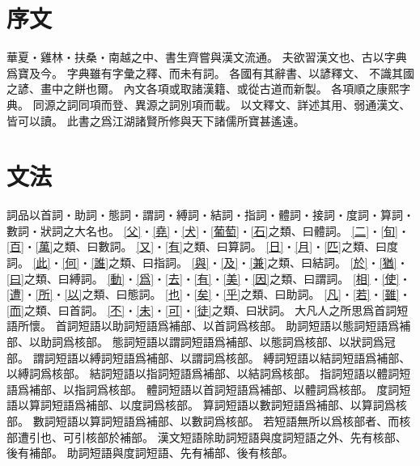 \chapter*{序文}
華夏・雞林・扶桑・南越之中、書生齊嘗與漢文流通。
夫欲習漢文也、古以字典爲寶及今。
字典雖有字彙之釋、而未有詞。
各國有其辭書、以諺釋文、
不識其國之諺、畫中之餅也爾。
內文各項或取諸漢籍、或從古道而新製。
各項順之康熙字典。
同源之詞同項而登、異源之詞別項而載。
以文釋文、詳述其用、弱通漢文、皆可以讀。
此書之爲江湖諸賢所修與天下諸儒所寶甚遙遠。
\chapter*{文法}
詞品以首詞・助詞・態詞・謂詞・縛詞・結詞・指詞・體詞・接詞・度詞・算詞・數詞・狀詞之大名也。
\cref{父}・\cref{堯}・\cref{犬}・\cref{葡萄}・\cref{石}之類、曰體詞。
\cref{二}・\cref{旬}・\cref{百}・\cref{萬}之類、曰數詞。
\cref{又}・\cref{有}之類、曰算詞。
\cref{日}・\cref{月}・\cref{匹}之類、曰度詞。
\cref{此}・\cref{何}・\cref{誰}之類、曰指詞。
\cref{與}・\cref{及}・\cref{兼}之類、曰結詞。
\cref{於}・\cref{猶}・\cref{曰}之類、曰縛詞。
\cref{動}・\cref{爲}・\cref{去}・\cref{有}・\cref{美}・\cref{因}之類、曰謂詞。
\cref{相}・\cref{使}・\cref{遭}・\cref{所}・\cref{以}之類、曰態詞。
\cref{也}・\cref{矣}・\cref{乎}之類、曰助詞。
\cref{凡}・\cref{若}・\cref{雖}・\cref{而}之類、曰首詞。
\cref{不}・\cref{未}・\cref{可}・\cref{徒}之類、曰狀詞。
大凡人之所思爲首詞短語所懷。
首詞短語以助詞短語爲補部、以首詞爲核部。
助詞短語以態詞短語爲補部、以助詞爲核部。
態詞短語以謂詞短語爲補部、以態詞爲核部、以狀詞爲冠部。
謂詞短語以縛詞短語爲補部、以謂詞爲核部。
縛詞短語以結詞短語爲補部、以縛詞爲核部。
結詞短語以指詞短語爲補部、以結詞爲核部。
指詞短語以體詞短語爲補部、以指詞爲核部。
體詞短語以首詞短語爲補部、以體詞爲核部。
度詞短語以算詞短語爲補部、以度詞爲核部。
算詞短語以數詞短語爲補部、以算詞爲核部。
數詞短語以算詞短語爲補部、以數詞爲核部。
若短語無所以爲核部者、而核部遭引也、可引核部於補部。
漢文短語除助詞短語與度詞短語之外、先有核部、後有補部。
助詞短語與度詞短語、先有補部、後有核部。
